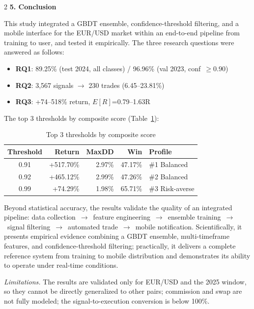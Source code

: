 \begin{multicols*}{2}
\noindent\textbf{5. Conclusion}

This study integrated a GBDT ensemble, confidence-threshold filtering, and a mobile interface for the EUR/USD market within an end-to-end pipeline from training to user, and tested it empirically. The three research questions were answered as follows:

\begin{itemize}\setlength\itemsep{0pt}\small
    \item \textbf{RQ1}: 89.25\% (test 2024, all classes) / 96.96\% (val 2023, conf~$\geq 0.90$)
    \item \textbf{RQ2}: 3{,}567 signals $\to$ 230 trades (6.45--23.81\%)
    \item \textbf{RQ3}: +74--518\% return, $E[R]$=0.79--1.63R
\end{itemize}

The top 3 thresholds by composite score (Table~\ref{tab:toven_rq3_summary}):

\begin{table}[H]
\centering
\caption{Top 3 thresholds by composite score}
\label{tab:toven_rq3_summary}
\scriptsize
\renewcommand{\arraystretch}{1.12}
\setlength{\tabcolsep}{2.5pt}
\begin{tabular}{|c|r|r|r|l|}
\hline
Threshold & Return & MaxDD & Win & Profile \\ \hline
0.91 & +517.70\% & 2.97\% & 47.17\% & \#1 Balanced \\ \hline
0.92 & +465.12\% & 2.99\% & 47.26\% & \#2 Balanced \\ \hline
0.99 & +74.29\%  & 1.98\% & 65.71\% & \#3 Risk-averse \\ \hline
\end{tabular}
\end{table}

Beyond statistical accuracy, the results validate the quality of an integrated pipeline: data collection~$\to$~feature engineering~$\to$~ensemble training~$\to$~signal filtering~$\to$~automated trade~$\to$~mobile notification. Scientifically, it presents empirical evidence combining a GBDT ensemble, multi-timeframe features, and confidence-threshold filtering; practically, it delivers a complete reference system from training to mobile distribution and demonstrates its ability to operate under real-time conditions.

\emph{Limitations.} The results are validated only for EUR/USD and the 2025 window, so they cannot be directly generalized to other pairs; commission and swap are not fully modeled; the signal-to-execution conversion is below 100\%.


\end{multicols*}
